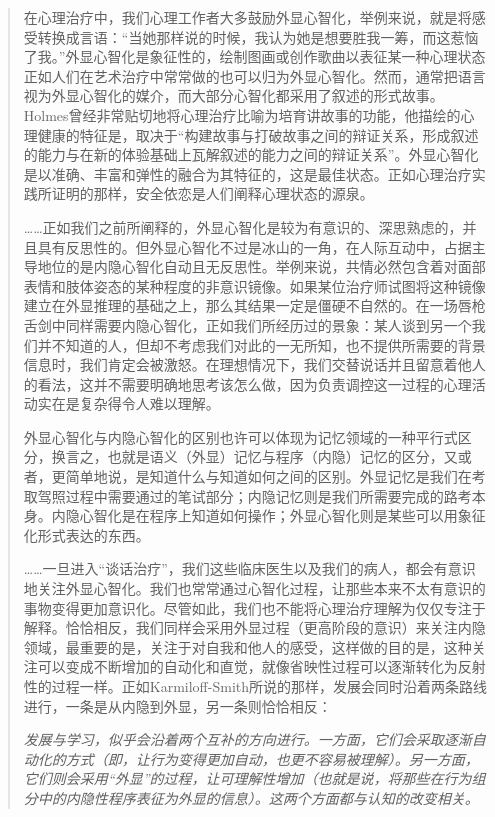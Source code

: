 \blockquote{
	在心理治疗中，我们心理工作者大多鼓励外显心智化，举例来说，就是将感受转换成言语：“当她那样说的时候，我认为她是想要胜我一筹，而这惹恼了我。”外显心智化是象征性的，绘制图画或创作歌曲以表征某一种心理状态\pozhehao{}正如人们在艺术治疗中常常做的\pozhehao{}也可以归为外显心智化。然而，通常把语言视为外显心智化的媒介，而大部分心智化都采用了叙述的形式\pozhehao{}故事。Holmes曾经非常贴切地将心理治疗比喻为培育讲故事的功能，他描绘的心理健康的特征是，取决于“构建故事与打破故事之间的辩证关系，形成叙述的能力与在新的体验基础上瓦解叙述的能力之间的辩证关系”。外显心智化是以准确、丰富和弹性的融合为其特征的，这是最佳状态。正如心理治疗实践所证明的那样，安全依恋是人们阐释心理状态的源泉。

	……正如我们之前所阐释的，外显心智化是较为有意识的、深思熟虑的，并且具有反思性的。但外显心智化不过是冰山的一角，在人际互动中，占据主导地位的是内隐心智化\pozhehao{}自动且无反思性。举例来说，共情必然包含着对面部表情和肢体姿态的某种程度的非意识镜像。如果某位治疗师试图将这种镜像建立在外显推理的基础之上，那么其结果一定是僵硬不自然的。在一场唇枪舌剑中同样需要内隐心智化，正如我们所经历过的景象：某人谈到另一个我们并不知道的人，但却不考虑我们对此的一无所知，也不提供所需要的背景信息时，我们肯定会被激怒。在理想情况下，我们交替说话并且留意着他人的看法，这并不需要明确地思考该怎么做，因为负责调控这一过程的心理活动实在是复杂得令人难以理解。

	外显心智化与内隐心智化的区别也许可以体现为记忆领域的一种平行式区分，换言之，也就是语义（外显）记忆与程序（内隐）记忆的区分，又或者，更简单地说，是知道什么与知道如何之间的区别。外显记忆是我们在考取驾照过程中需要通过的笔试部分；内隐记忆则是我们所需要完成的路考本身。内隐心智化是在程序上知道如何操作；外显心智化则是某些可以用象征化形式表达的东西。

	……一旦进入“谈话治疗”，我们这些临床医生以及我们的病人，都会有意识地关注外显心智化。我们也常常通过心智化过程，让那些本来不太有意识的事物变得更加意识化。尽管如此，我们也不能将心理治疗理解为仅仅专注于解释。恰恰相反，我们同样会采用外显过程（更高阶段的意识）来关注内隐领域，最重要的是，关注于对自我和他人的感受，这样做的目的是，这种关注可以变成不断增加的自动化和直觉，就像省映性过程可以逐渐转化为反射性的过程一样。正如Karmiloff-Smith所说的那样，发展会同时沿着两条路线进行，一条是从内隐到外显，另一条则恰恰相反：

	\itshape 发展与学习，似乎会沿着两个互补的方向进行。一方面，它们会采取逐渐自动化的方式（即，让行为变得更加自动，也更不容易被理解）。另一方面，它们则会采用“外显”的过程，让可理解性增加（也就是说，将那些在行为组分中的内隐性程序表征为外显的信息）。这两个方面都与认知的改变相关。
}

